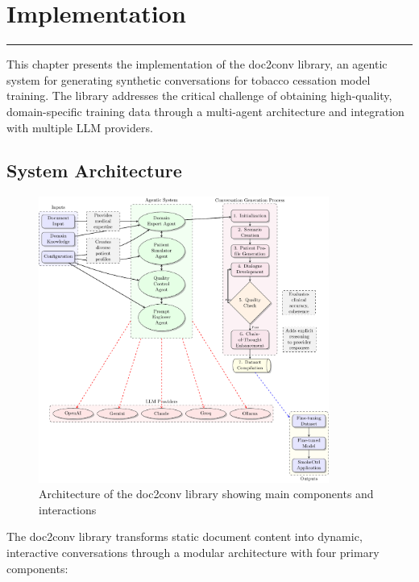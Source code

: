\chapter{Implementation}
\label{Chapter5}

\begin{center}
\rule{0.5\textwidth}{0.5pt}
\end{center}

This chapter presents the implementation of the doc2conv library, an agentic system for generating synthetic conversations for tobacco cessation model training. The library addresses the critical challenge of obtaining high-quality, domain-specific training data through a multi-agent architecture and integration with multiple LLM providers.

\section{System Architecture}

\begin{figure}[h]
    \centering
    \includegraphics[width=0.85\textwidth]{Pictures/doc2conv_architecture.pdf}
    \caption{Architecture of the doc2conv library showing main components and interactions}
    \label{fig:doc2conv_architecture}
\end{figure}

The doc2conv library transforms static document content into dynamic, interactive conversations through a modular architecture with four primary components:

